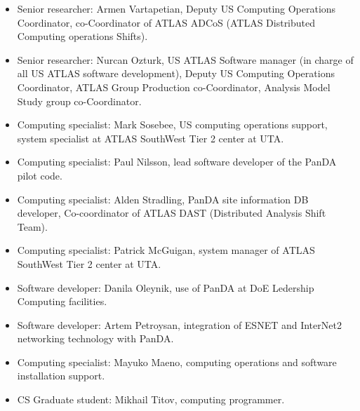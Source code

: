 \begin{itemize}[noitemsep,nolistsep]
    \item Senior researcher: Armen Vartapetian, Deputy US Computing Operations Coordinator, co-Coordinator of ATLAS ADCoS (ATLAS Distributed Computing operations Shifts).
    \item Senior researcher: Nurcan Ozturk, US ATLAS Software manager (in charge of all US ATLAS software development), Deputy US Computing Operations Coordinator, ATLAS Group Production co-Coordinator, Analysis Model Study group co-Coordinator.
    \item Computing specialist: Mark Sosebee, US computing operations support, system specialist at ATLAS SouthWest Tier 2 center at UTA.
    \item Computing specialist: Paul Nilsson, lead software developer of the PanDA pilot code.
    \item Computing specialist: Alden Stradling, PanDA site information DB developer, Co-coordinator of ATLAS DAST (Distributed Analysis Shift Team).
    \item Computing specialist: Patrick McGuigan, system manager of ATLAS SouthWest Tier 2 center at UTA.
    \item Software developer: Danila Oleynik, use of PanDA at DoE Ledership Computing facilities.
    \item Software developer: Artem Petroysan, integration of ESNET and InterNet2 networking technology with PanDA.
    \item Computing specialist: Mayuko Maeno, computing operations and software installation support.
    \item CS Graduate student: Mikhail Titov, computing programmer.
\end{itemize}
